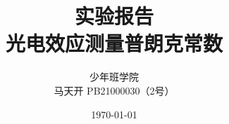 \documentclass[a4paper]{ltxdoc}
\title {实验报告\\光电效应测量普朗克常数}
\author {少年班学院\\马天开 PB21000030（2号）}
\date {\today}
\begin{document}
\begin{multicols}{2}
    \maketitle
\end{multicols}
\end{document}
